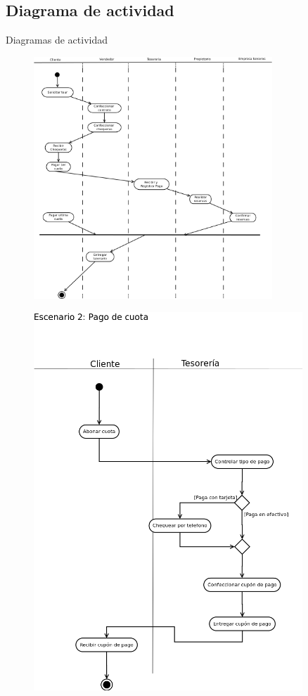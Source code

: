 \documentclass[12pt,a4paper,titlepage,oneside]{article}
\begin{document}
\newpage
\subsection{Diagrama de actividad}

Diagramas de actividad
\bigskip

\begin{figure}[htb]
\centerline{\includegraphics[width=0.8\textwidth]{escenario1}}
\label{fig:celda}
\end{figure}

\begin{figure}[htb]
\centerline{\includegraphics[width=0.9\textwidth]{escenario2}}
\label{fig:celda}
\end{figure}
\end{document}
